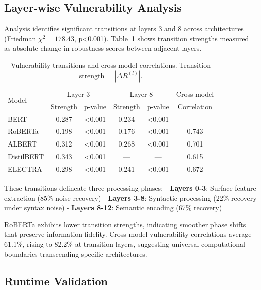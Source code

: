 \documentclass{article}
\begin{document}
\subsection{Layer-wise Vulnerability Analysis}

Analysis identifies significant transitions at layers 3 and 8 across architectures (Friedman $\chi^2=178.43$, p<0.001). Table~\ref{tab:transitions} shows transition strengths measured as absolute change in robustness scores between adjacent layers.

\begin{table}[t]
\centering
\caption{Vulnerability transitions and cross-model correlations. Transition strength = $|\Delta R^{(l)}|$.}
\label{tab:transitions}
\vspace{2mm}
\begin{tabular}{l|cc|cc|c}
\toprule
\multirow{2}{*}{Model} & \multicolumn{2}{c|}{Layer 3} & \multicolumn{2}{c|}{Layer 8} & Cross-model \\
 & Strength & p-value & Strength & p-value & Correlation \\
\midrule
BERT & 0.287 & <0.001 & 0.234 & <0.001 & --- \\
RoBERTa & 0.198 & <0.001 & 0.176 & <0.001 & 0.743 \\
ALBERT & 0.312 & <0.001 & 0.268 & <0.001 & 0.701 \\
DistilBERT & 0.343 & <0.001 & --- & --- & 0.615 \\
ELECTRA & 0.298 & <0.001 & 0.241 & <0.001 & 0.672 \\
\bottomrule
\end{tabular}
\end{table}

These transitions delineate three processing phases:
- \textbf{Layers 0-3}: Surface feature extraction (85\% noise recovery)
- \textbf{Layers 3-8}: Syntactic processing (22\% recovery under syntax noise)
- \textbf{Layers 8-12}: Semantic encoding (67\% recovery)

RoBERTa exhibits lower transition strengths, indicating smoother phase shifts that preserve information fidelity. Cross-model vulnerability correlations average 61.1\%, rising to 82.2\% at transition layers, suggesting universal computational boundaries transcending specific architectures.

\subsection{Runtime Validation}
\end{document}
